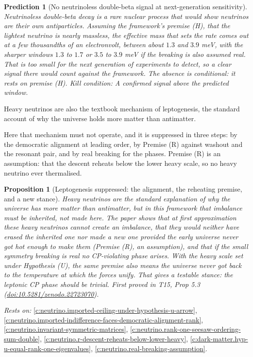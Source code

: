 \documentclass[11pt]{article}
\newtheorem{proposition}[theorem]{Proposition}
\newtheorem{prediction}[theorem]{Prediction}
\theoremstyle{definition}
\theoremstyle{plain}
\begin{document}
\begin{prediction}[No neutrinoless double-beta signal at next-generation sensitivity]\label{c:pred.no-neutrinoless-double-beta}
Neutrinoless double-beta decay is a rare nuclear process that would show neutrinos are their own antiparticles. Assuming the framework's premise (H), that the lightest neutrino is nearly massless, the effective mass that sets the rate comes out at a few thousandths of an electronvolt, between about $1.3$ and $3.9$ meV, with the sharper windows $1.3$ to $1.7$ or $3.5$ to $3.9$ meV if the breaking is also assumed real. That is too small for the next generation of experiments to detect, so a clear signal there would count against the framework. The absence is conditional: it rests on premise (H).
\emph{Kill condition:} A confirmed signal above the predicted window.
\end{prediction}

Heavy neutrinos are also the textbook mechanism of leptogenesis, the standard account of why the universe holds more matter than antimatter.

Here that mechanism must not operate, and it is suppressed in three steps: by the democratic alignment at leading order, by Premise (R) against washout and the resonant pair, and by real breaking for the phases. Premise (R) is an assumption: that the descent reheats below the lower heavy scale, so no heavy neutrino ever thermalised.

\begin{proposition}[Leptogenesis suppressed: the alignment, the reheating premise, and a new stance]\label{c:neutrino.leptogenesis-suppressed-alignment-reheating-premise-new}
Heavy neutrinos are the standard explanation of why the universe has more matter than antimatter, but in this framework that imbalance must be inherited, not made here. The paper shows that at first approximation these heavy neutrinos cannot create an imbalance, that they would neither have erased the inherited one nor made a new one provided the early universe never got hot enough to make them (Premise (R), an assumption), and that if the small symmetry breaking is real no CP-violating phase arises. With the heavy scale set under Hypothesis (U), the same premise also means the universe never got back to the temperature at which the forces unify. That gives a testable stance: the leptonic CP phase should be trivial.
\emph{First proved in} T15, Prop 5.3 (\href{https://doi.org/10.5281/zenodo.22723070}{doi:10.5281/zenodo.22723070}).
\end{proposition}
\noindent\emph{Rests on:} \ref{c:neutrino.imported-ceiling-under-hypothesis-u-arrow}, \ref{c:neutrino.imported-indifference-faces-democratic-alignment-rank}, \ref{c:neutrino.invariant-symmetric-matrices}, \ref{c:neutrino.rank-one-seesaw-ordering-sum-double}, \ref{c:neutrino.r-descent-reheats-below-lower-heavy}, \ref{c:dark-matter.hyp-u-equal-rank-one-eigenvalues}, \ref{c:neutrino.real-breaking-assumption}.
\end{document}
